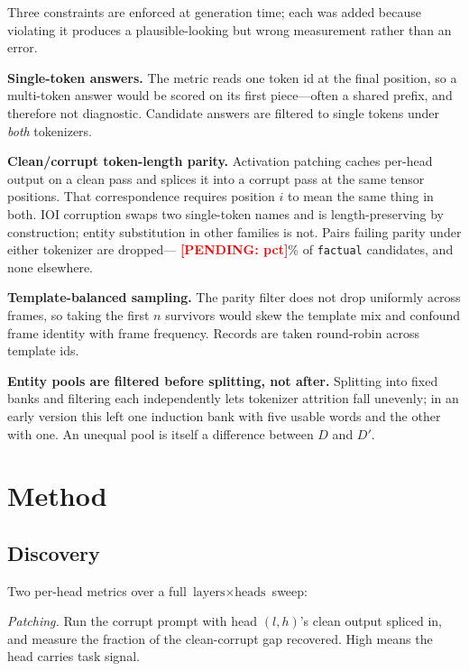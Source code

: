 \documentclass[11pt,a4paper]{article}
\newcounter{pendingcount}
\DeclareRobustCommand{\pending}[1]{\stepcounter{pendingcount}%
  \textcolor{red}{\textbf{[PENDING: #1]}}}
\begin{document}
Three constraints are enforced at generation time; each was added because violating it
produces a plausible-looking but wrong measurement rather than an error.

\textbf{Single-token answers.} The metric reads one token id at the final position, so
a multi-token answer would be scored on its first piece---often a shared prefix, and
therefore not diagnostic. Candidate answers are filtered to single tokens under
\emph{both} tokenizers.

\textbf{Clean/corrupt token-length parity.} Activation patching caches per-head output
on a clean pass and splices it into a corrupt pass at the same tensor positions. That
correspondence requires position $i$ to mean the same thing in both. IOI corruption
swaps two single-token names and is length-preserving by construction; entity
substitution in other families is not. Pairs failing parity under either tokenizer are
dropped---\pending{pct}\% of \texttt{factual} candidates, and none elsewhere.

\textbf{Template-balanced sampling.} The parity filter does not drop uniformly across
frames, so taking the first $n$ survivors would skew the template mix and confound
frame identity with frame frequency. Records are taken round-robin across template ids.

\textbf{Entity pools are filtered before splitting, not after.} Splitting into fixed
banks and filtering each independently lets tokenizer attrition fall unevenly; in an
early version this left one induction bank with five usable words and the other with
one. An unequal pool is itself a difference between $D$ and $D'$.

\section{Method}
\label{sec:method}

\subsection{Discovery}
\label{sec:discovery}

Two per-head metrics over a full $\text{layers} \times \text{heads}$ sweep:

\emph{Patching.} Run the corrupt prompt with head $(l,h)$'s clean output spliced in,
and measure the fraction of the clean-corrupt gap recovered. High means the head
carries task signal.
\end{document}
